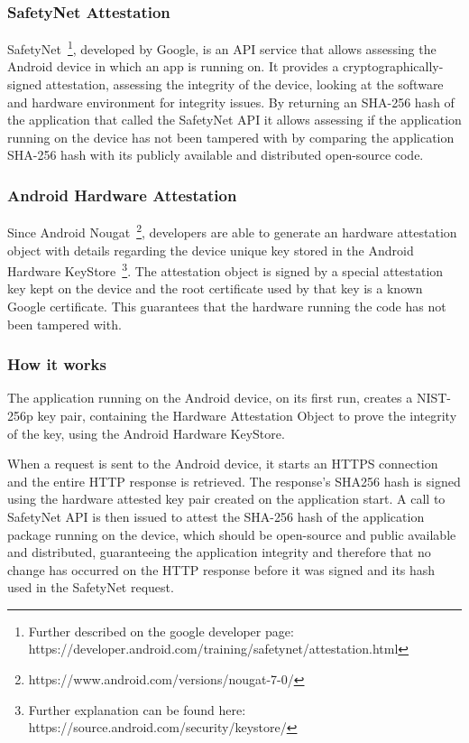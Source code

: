 \subsubsection{SafetyNet Attestation}
SafetyNet~\footnote{Further described on the google developer page: https://developer.android.com/training/safetynet/attestation.html}, developed by Google, is an API service that allows assessing the Android device in which an app is running on. It provides a cryptographically-signed attestation, assessing the integrity of the device, looking at the software and hardware environment for integrity issues. By returning an SHA-256 hash of the application that called the SafetyNet API it allows assessing if the application running on the device has not been tampered with by comparing the application SHA-256 hash with its publicly available and distributed open-source code.

\subsubsection{Android Hardware Attestation}
Since Android Nougat~\footnote{https://www.android.com/versions/nougat-7-0/}, developers are able to generate an hardware attestation object with details regarding the device unique key stored in the Android Hardware KeyStore~\footnote{Further explanation can be found here: https://source.android.com/security/keystore/}. The attestation object is signed by a special attestation key kept on the device and the root certificate used by that key is a known Google certificate. This guarantees that the hardware running the code has not been tampered with.

\subsubsection{How it works}
The application running on the Android device, on its first run, creates a NIST-256p key pair, containing the Hardware Attestation Object to prove the integrity of the key, using the Android Hardware KeyStore.

When a request is sent to the Android device, it starts an HTTPS connection and the entire HTTP response is retrieved. The response's SHA256 hash is signed using the hardware attested key pair created on the application start. A call to SafetyNet API is then issued to attest the SHA-256 hash of the application package running on the device, which should be open-source and public available and distributed, guaranteeing the application integrity and therefore that no change has occurred on the HTTP response before it was signed and its hash used in the SafetyNet request.

